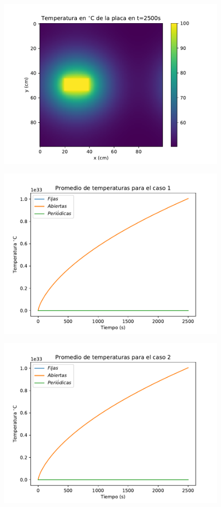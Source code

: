 \documentclass[12pt,letterpaper]{article}
\begin{document}
\begin{figure}[ht]
\includegraphics{p2_2500.pdf}
\centering
\end{figure}

\begin{figure}[ht]
\includegraphics{prom1.pdf}
\centering
\end{figure}

\begin{figure}[ht]
\includegraphics{prom2.pdf}
\centering
\end{figure}


\vspace{0.3cm}
\end{document}
